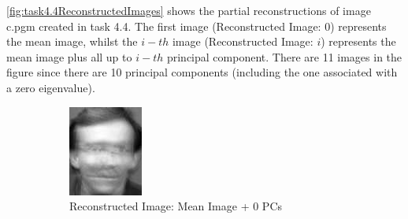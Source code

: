 \documentclass[12pt]{article}
\begin{document}
\cref{fig:task4.4ReconstructedImages} shows the partial reconstructions of image c.pgm created in task 4.4. The first image (Reconstructed Image: 0) represents the mean image, whilst the $i-th$ image (Reconstructed Image: $i$) represents the mean image plus all up to $i-th$ principal component. There are 11 images in the figure since there are 10 principal components (including the one associated with a zero eigenvalue).

\begin{figure}
	\centering
	\begin{subfigure}[b]{0.20\textwidth}
		\includegraphics[width=\textwidth]{Task4.3_Images/ReconstructedImage0.jpg}
		\caption{Reconstructed Image: Mean Image + 0 PCs}
	\end{subfigure}\quad
	\begin{subfigure}[b]{0.20\textwidth}

\end{subfigure}
\end{figure}
\end{document}
